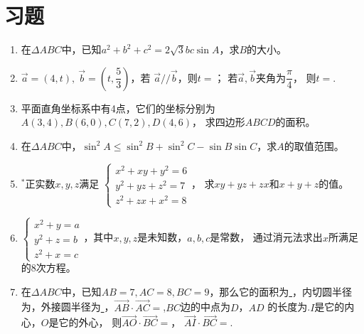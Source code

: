 \section{习题}
\begin{enumerate}[label={\textbf{\arabic*.}},leftmargin=
    \inteval{\myenumleftmargin}pt]
\item 在$ \Delta ABC $中，已知$ a^2+b^2+c^2=2\sqrt{3}bc\sin A $，求$ B $的大小。

\item $ \vec{a}=(4,t),\ \vec{b}=\left(t,\dfrac{5}{3}\right) $，若
$ \vec{a}//\vec{b} $，则$ t= $\underline{\hspace{2cm}}；
若$ \vec{a},\vec{b} $夹角为$ \dfrac{\pi}{4} $，
则$ t= $\underline{\hspace{2cm}}.

\item 平面直角坐标系中有4点，它们的坐标分别为$ A(3,4),B(6,0),C(7,2),D(4,6) $，
求四边形$ ABCD $的面积。

\item 在$ \Delta ABC $中，$ \sin^2A\leq\sin^2B+\sin^2C-
\sin B\sin C $，求$ A $的取值范围。

\item $ ^* $正实数$ x,y,z $满足
$ \begin{cases} 
    x^2+xy+y^2= 6 \\
    y^2+yz+z^2= 7 \\
    z^2+zx+x^2= 8  \end{cases} $，
求$ xy+yz+zx $和$ x+y+z $的值。

\item 
$\begin{cases}
    x^2+y=a \\
    y^2+z=b \\
    z^2+x=c 
\end{cases}$，其中$x,y,z$是未知数，$a,b,c$是常数，
通过消元法求出$x$所满足的8次方程。

\item 在$ \Delta ABC $中，已知$ AB=7,AC=8,BC=9 $，那么它的面积为\underline{
    \hspace{1cm}}，内切圆半径为\underline{\hspace{1cm}}，外接圆半径为\underline{
    \hspace{1cm}}，$ \vec{AB}\cdot \vec{AC}
=$\underline{\hspace{1cm}},$ BC $边的中点为$ D $，$ AD $
的长度为\underline{\hspace{1cm}}.$ I $是它的内心，$ O $是它的外心，
则$ \vec{AO}\cdot\vec{BC} = $\underline{\hspace{2cm}}，
$ \vec{AI}\cdot\vec{BC}= $\underline{\hspace{2cm}}.


\end{enumerate}
